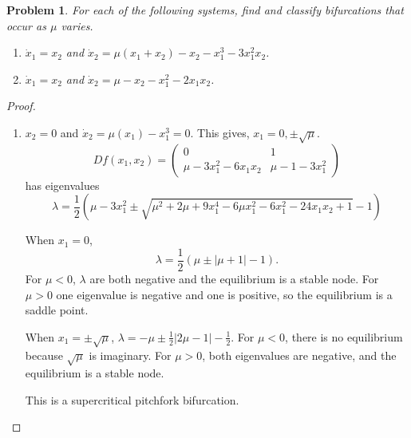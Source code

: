 \documentclass[12pt]{exam}
\renewenvironment{solution}%
{%
    \renewcommand{\proofname}{Solution}%
    \begin{proof}%
}{\end{proof}}
\theoremstyle{mytheoremstyle}
\newtheorem{problem}{Problem}
\begin{document}
\newpage
\begin{problem}
For each of the following systems, find and classify bifurcations that occur as $\mu$ varies. 
\begin{enumerate}[label=(P\arabic*)]
    \item $\dot{x}_1 = x_2$ and $\dot{x}_2 = \mu(x_1 + x_2) - x_2 - x_1^3 - 3 x_1^2 x_2$. 
    \item $\dot{x}_1 = x_2$ and $\dot{x}_2 = \mu - x_2 - x_1^2 - 2x_1 x_2$. 
\end{enumerate}
\end{problem}
\begin{solution}
	\begin{enumerate}[label=(P\arabic*)]
		\item $ x_2= 0$ and $\dot{x}_2 = \mu(x_1) - x_1^3 = 0$. This gives, 
			$x_1 = 0,\pm \sqrt{\mu}$. 
			$$
				Df(x_1,x_2) = 
				\begin{pmatrix} 
					0 & 1 \\ 
					\mu-3 x_1^2 - 6 x_1 x_2 & \mu - 1 -3 x_1^2
				\end{pmatrix}
			$$ 
			has eigenvalues 
		$$ 
			\lambda = \frac{1}{2} \left(\mu -3 x_1^2\pm \sqrt{\mu ^2+2 \mu +9 x_1^4-6 \mu  x_1^2-6 x_1^2-24 x_1 x_2+1}-1\right)
		$$
		
		When $x_1 = 0$, 
		$$
			\lambda = \frac{1}{2} \left(\mu \pm|\mu +1|-1\right).
		$$ 
		For $\mu < 0$, $\lambda$ are both negative and the equilibrium is a
		stable node. For $\mu > 0 $ one eigenvalue is negative and one is
		positive, so the equilibrium is a saddle point.
		
		When $x_1 = \pm \sqrt{\mu}$, $\lambda = -\mu \pm \frac{1}{2} |2 \mu
		-1|-\frac{1}{2}$. For $\mu < 0$, there is no equilibrium because
		$\sqrt{\mu}$ is imaginary. For $\mu > 0$, both eigenvalues are negative,
		and the equilibrium is a stable node. 
		
		This is a supercritical pitchfork bifurcation. 
		

\end{enumerate}
\end{solution}
\end{document}
